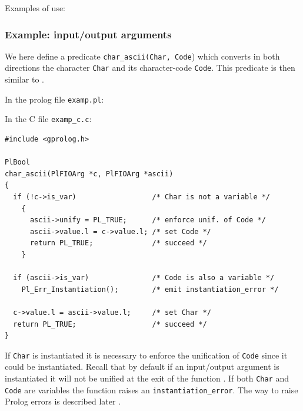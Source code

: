 Examples of use:

\begin{CodeTwoCols}
\SkipLine
{}
\SkipLine
{}
\SkipLine
{}
\SkipLine
{}
\end{CodeTwoCols}

\subsubsection{Example: input/output arguments}
We here define a predicate \texttt{char\_ascii(Char, Code}) which converts
in both directions the character \texttt{Char} and its character-code
\texttt{Code}. This predicate is then similar to 
.

In the prolog file \texttt{examp.pl}:


In the C file \texttt{examp\_c.c}:

\begin{Code}
\begin{verbatim}
#include <gprolog.h>

PlBool
char_ascii(PlFIOArg *c, PlFIOArg *ascii)
{
  if (!c->is_var)                  /* Char is not a variable */
    {
      ascii->unify = PL_TRUE;      /* enforce unif. of Code */
      ascii->value.l = c->value.l; /* set Code */
      return PL_TRUE;              /* succeed */
    }

  if (ascii->is_var)               /* Code is also a variable */
    Pl_Err_Instantiation();        /* emit instantiation_error */

  c->value.l = ascii->value.l;     /* set Char */
  return PL_TRUE;                  /* succeed */
}
\end{verbatim}
\end{Code}

If \texttt{Char} is instantiated it is necessary to enforce the unification
of \texttt{Code} since it could be instantiated. Recall that by default if
an input/output argument is instantiated it will not be unified at the exit
of the function . If both \texttt{Char} and
\texttt{Code} are variables the function raises an
\texttt{instantiation\_error}. The way to raise Prolog errors is described
later .

